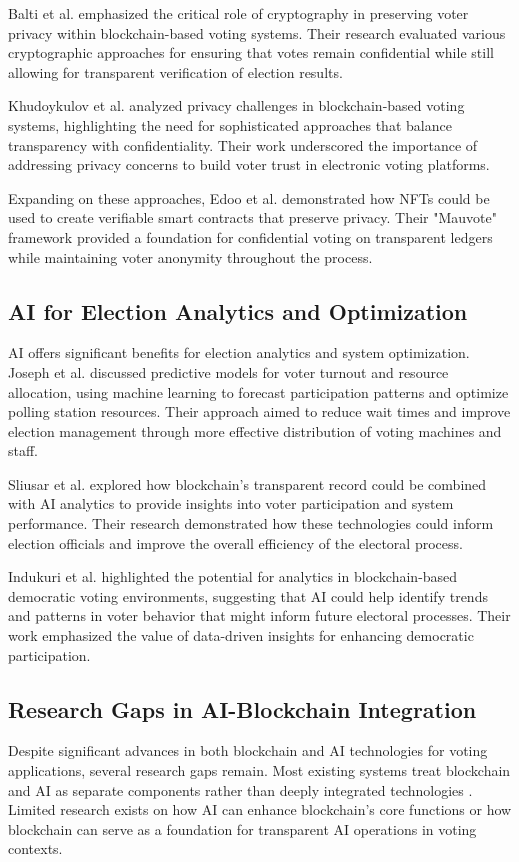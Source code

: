 \documentclass[conference]{IEEEtran}
\begin{document}
Balti et al. \cite{b2} emphasized the critical role of cryptography in preserving voter privacy within blockchain-based voting systems. Their research evaluated various cryptographic approaches for ensuring that votes remain confidential while still allowing for transparent verification of election results.

Khudoykulov et al. \cite{b1} analyzed privacy challenges in blockchain-based voting systems, highlighting the need for sophisticated approaches that balance transparency with confidentiality. Their work underscored the importance of addressing privacy concerns to build voter trust in electronic voting platforms.

Expanding on these approaches, Edoo et al. \cite{b7} demonstrated how NFTs could be used to create verifiable smart contracts that preserve privacy. Their "Mauvote" framework provided a foundation for confidential voting on transparent ledgers while maintaining voter anonymity throughout the process.

\subsection{AI for Election Analytics and Optimization}
AI offers significant benefits for election analytics and system optimization. Joseph et al. \cite{b6} discussed predictive models for voter turnout and resource allocation, using machine learning to forecast participation patterns and optimize polling station resources. Their approach aimed to reduce wait times and improve election management through more effective distribution of voting machines and staff.

Sliusar et al. \cite{b4} explored how blockchain's transparent record could be combined with AI analytics to provide insights into voter participation and system performance. Their research demonstrated how these technologies could inform election officials and improve the overall efficiency of the electoral process.

Indukuri et al. \cite{b8} highlighted the potential for analytics in blockchain-based democratic voting environments, suggesting that AI could help identify trends and patterns in voter behavior that might inform future electoral processes. Their work emphasized the value of data-driven insights for enhancing democratic participation.

\subsection{Research Gaps in AI-Blockchain Integration}
Despite significant advances in both blockchain and AI technologies for voting applications, several research gaps remain. Most existing systems treat blockchain and AI as separate components rather than deeply integrated technologies \cite{b4}. Limited research exists on how AI can enhance blockchain's core functions or how blockchain can serve as a foundation for transparent AI operations in voting contexts.
\end{document}
